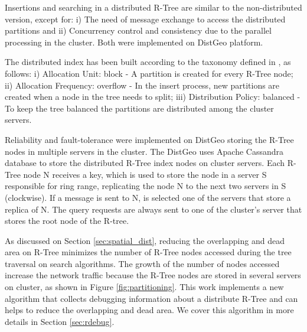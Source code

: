 Insertions and searching in a distributed R-Tree are similar to the non-distributed version, except for: i) The need of message exchange to access the distributed partitions and
ii) Concurrency control and consistency due to the parallel processing in the cluster. Both were implemented on DistGeo platform.

The distributed index has been built according to the taxonomy defined in \cite{an1999storing}, as follows: i) Allocation Unit: block - A partition is created for every R-Tree node; 
ii) Allocation Frequency: overflow - In the insert process, new partitions are created when a node in the tree needs to split; 
iii) Distribution Policy: balanced - To keep the tree balanced the partitions are distributed among the cluster servers.
	
Reliability and fault-tolerance were implemented on DistGeo storing the R-Tree nodes in multiple servers in the cluster. 
The DistGeo uses Apache Cassandra \cite{cassandra1apache} database to store the distributed R-Tree index nodes on cluster servers.
Each R-Tree node N receives a key, which is used to store the node in a server S responsible for ring range, replicating the node N to the next two servers in S (clockwise). 
If a message is sent to N, is selected one of the servers that store a replica of N.
The query requests are always sent to one of the cluster's server that stores the root node of the R-tree. 

As discussed on Section \ref{sec:spatial_dist}, reducing the overlapping and dead area on R-Tree minimizes the number of R-Tree nodes accessed during the tree traversal on search algorithms.
The growth of the number of nodes accessed increase the network traffic because the R-Tree nodes are stored in several servers on cluster, as shown in Figure \ref{fig:partitioning}.
This work implements a new algorithm that collects debugging information about a distribute R-Tree and can helps to reduce the overlapping and dead area.
We cover this algorithm in more details in Section \ref{sec:rdebug}.